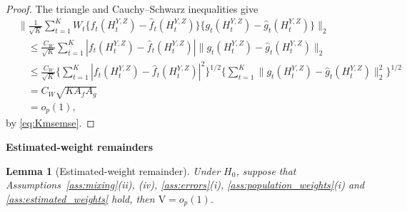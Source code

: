 \documentclass[12pt]{article}
\newtheorem{lemma}[theorem]{Lemma}
\numberwithin{equation}{section}
\begin{document}
\begin{proof}
The triangle and Cauchy--Schwarz inequalities give
\begin{equation}
\label{eq:termIV-product-bound}
\begin{aligned}
&\Big\|\frac1{\sqrt K}\sum_{t=1}^K W_t
\{f_t(H_t^{Y,Z})-\hat f_t(H_t^{Y,Z})\}
\{g_t(H_t^{Y,Z})-\hat g_t(H_t^{Y,Z})\}\Big\|_2\\
&\quad\leq\frac{C_W}{\sqrt K}\sum_{t=1}^K
|f_t(H_t^{Y,Z})-\hat f_t(H_t^{Y,Z})|
\|g_t(H_t^{Y,Z})-\hat g_t(H_t^{Y,Z})\|_2\\
&\quad\leq\frac{C_W}{\sqrt K}
\Big\{\sum_{t=1}^K|f_t(H_t^{Y,Z})-\hat f_t(H_t^{Y,Z})|^2\Big\}^{1/2}
\Big\{\sum_{t=1}^K\|g_t(H_t^{Y,Z})-\hat g_t(H_t^{Y,Z})\|_2^2\Big\}^{1/2}\\
&\quad=C_W\sqrt{K A_fA_g}\\
&\quad =o_p(1),
\end{aligned}
\end{equation}
by \eqref{eq:Kmsemse}.
\end{proof}
 

{\textbf{Estimated-weight remainders}}

\begin{lemma}[Estimated-weight remainder]
\label{lem:estimated-weight-remainder}
Under \(H_0\), suppose that Assumptions~\ref{ass:mixing}(ii), (iv),
\ref{ass:errors}(i), \ref{ass:population_weights}(i) and
\ref{ass:estimated_weights} hold, 
then \(\mathrm V=o_p(1)\).
\end{lemma}
\end{document}
